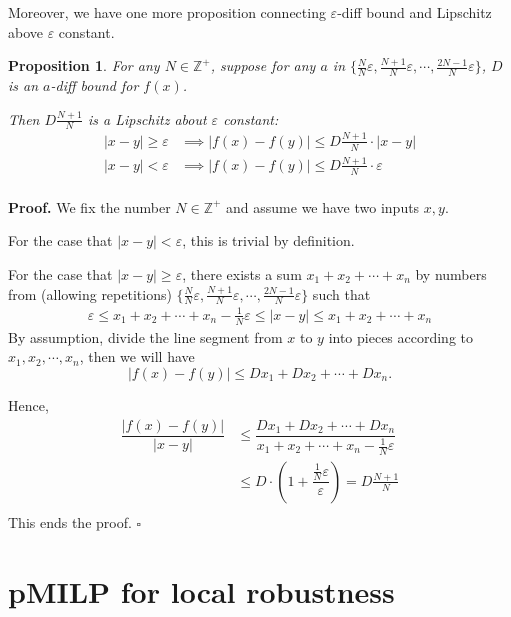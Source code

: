 \documentclass[letterpaper]{article} %
\newtheorem{proposition}{Proposition}
\begin{document}
	
	Moreover, we have one more proposition connecting $\varepsilon$-diff bound and Lipschitz above $\varepsilon$ constant.
	
	
	\begin{proposition}
		For any $N\in\mathbb{Z}^+$, suppose for any $a$ in $\{\frac{N}{N}\varepsilon,\frac{N+1}{N}\varepsilon,\cdots, \frac{2N-1}{N}\varepsilon\}$, $D$ is an $a$-diff bound for $f(x)$. 
		
		Then $D\frac{N+1}{N}$ is a Lipschitz about $\varepsilon$ constant:\begin{align*}
			|x-y|\geq \varepsilon &\implies |f(x)-f(y)| \leq D\frac{N+1}{N} \cdot |x-y|\\
			|x-y|<\varepsilon &\implies |f(x)-f(y)| \leq D\frac{N+1}{N} \cdot \varepsilon\\
		\end{align*}
	\end{proposition}
	
	\textbf{Proof.}
	We fix the number $N\in\mathbb{Z}^+$ and assume we have two inputs $x, y$.
	
	For the case that $|x-y|<\varepsilon$, this is trivial by definition.
	
	For the case that $|x-y|\geq \varepsilon$, there exists a sum $x_1+x_2+\cdots+x_n$ by numbers from (allowing repetitions) $\{\frac{N}{N}\varepsilon,\frac{N+1}{N}\varepsilon,\cdots, \frac{2N-1}{N}\varepsilon\}$ such that \begin{align*}
		\varepsilon \leq x_1+x_2+\cdots+x_n -\frac{1}{N}\varepsilon \leq |x-y| \leq x_1+x_2+\cdots+x_n
	\end{align*}
	By assumption, divide the line segment from $x$ to $y$ into pieces according to $x_1, x_2,\cdots,x_n$, then we will have $$|f(x)-f(y)|\leq Dx_1+Dx_2+\cdots+Dx_n.$$
	
	Hence,\begin{align*}
		\dfrac{|f(x)-f(y)|}{|x-y|} &\leq \dfrac{Dx_1+Dx_2+\cdots+Dx_n}{x_1+x_2+\cdots+x_n -\frac{1}{N}\varepsilon}\\
		& \leq D\cdot( 1+  \dfrac{\frac{1}{N}\varepsilon}{\varepsilon})= D \frac{N+1}{N}\\
	\end{align*}
	This ends the proof.
	\hfill $\square$
	
	
	
	\section{pMILP for local robustness}
	
\end{document}
